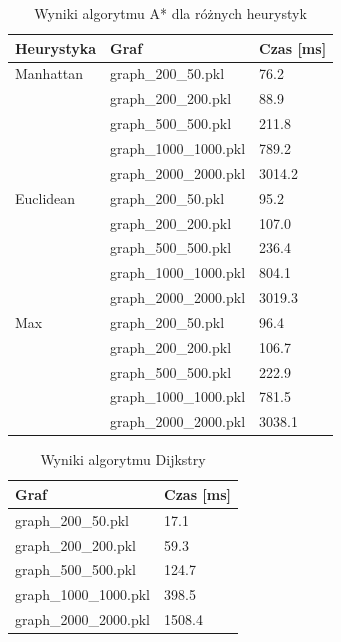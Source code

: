 \documentclass[12pt,twoside]{article}
\begin{document}
\clearpage

\begin{table}[ht]
\caption{Wyniki algorytmu A* dla różnych heurystyk}
\centering		
\begin{tabular}{|p{}|p{}|p{}|}	
\hline
Heurystyka & Graf & Czas [ms] \\
\hline
Manhattan & 
graph\_200\_50.pkl & 
76.2 \\
 & 
graph\_200\_200.pkl & 
88.9 \\
 & 
graph\_500\_500.pkl & 
211.8 \\
 & 
graph\_1000\_1000.pkl & 
789.2 \\
 & 
graph\_2000\_2000.pkl & 
3014.2 \\
\hline
Euclidean & 
graph\_200\_50.pkl & 
95.2 \\
 & 
graph\_200\_200.pkl & 
107.0 \\
 & 
graph\_500\_500.pkl & 
236.4 \\
 & 
graph\_1000\_1000.pkl & 
804.1 \\
 & 
graph\_2000\_2000.pkl & 
3019.3 \\
\hline
Max & 
graph\_200\_50.pkl & 
96.4 \\
 & 
graph\_200\_200.pkl & 
106.7 \\
 & 
graph\_500\_500.pkl & 
222.9 \\
 & 
graph\_1000\_1000.pkl & 
781.5 \\
 & 
graph\_2000\_2000.pkl & 
3038.1 \\
\hline
\end{tabular}	

\label{Tab:Astar_results}
\end{table}



\begin{table}[ht]
\caption{Wyniki algorytmu Dijkstry}
\centering		
\begin{tabular}{|p{}|p{}|}	
\hline
Graf & Czas [ms] \\
\hline
graph\_200\_50.pkl & 
17.1 \\
graph\_200\_200.pkl & 
59.3 \\
graph\_500\_500.pkl & 
124.7 \\
graph\_1000\_1000.pkl & 
398.5 \\
graph\_2000\_2000.pkl & 
1508.4 \\
\hline
\end{tabular}	

\label{Tab:Dijkstra_results}
\end{table}
\end{document}
